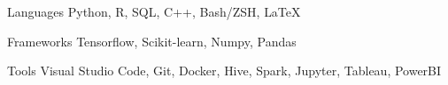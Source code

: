

\begin{cvskills}

  \cvskill
    {Languages} %
    {Python, R, SQL, C++, Bash/ZSH, {\LaTeX{}}} %

  \cvskill
    {Frameworks} %
    {Tensorflow, Scikit-learn, Numpy, Pandas} %

  \cvskill
    {Tools} %
    {Visual Studio Code, Git, Docker, Hive, Spark, Jupyter, Tableau, PowerBI} %


\end{cvskills}
